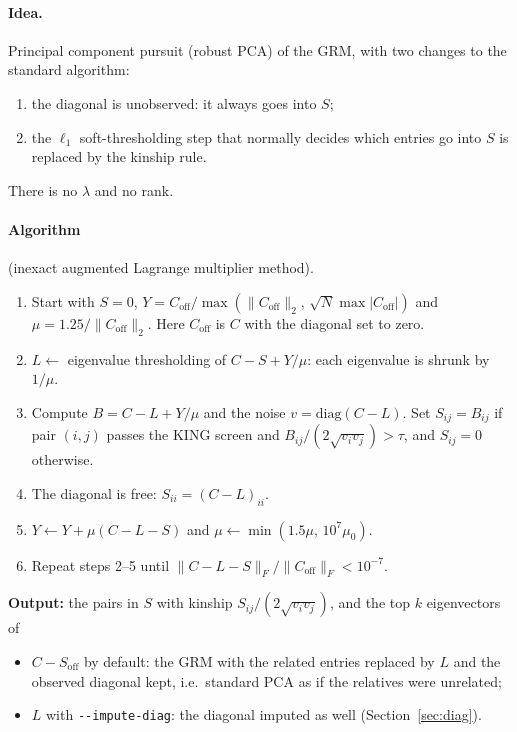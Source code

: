 \documentclass[11pt,a4paper]{article}
\newcommand{\opt}[1]{\texttt{-{}-#1}}
\begin{document}
\paragraph{Idea.}
Principal component pursuit (robust PCA) of the GRM, with two changes to the
standard algorithm:
\begin{enumerate}
  \item the diagonal is unobserved: it always goes into $S$;
  \item the $\ell_1$ soft-thresholding step that normally decides which
    entries go into $S$ is replaced by the kinship rule.
\end{enumerate}
There is no $\lambda$ and no rank.

\paragraph{Algorithm} (inexact augmented Lagrange multiplier method).
\begin{enumerate}
  \item Start with $S=0$, $Y=C_{\mathrm{off}}/\max(\|C_{\mathrm{off}}\|_2,\,
    \sqrt N\max|C_{\mathrm{off}}|)$ and $\mu=1.25/\|C_{\mathrm{off}}\|_2$.
    Here $C_{\mathrm{off}}$ is $C$ with the diagonal set to zero.
  \item $L \leftarrow$ eigenvalue thresholding of $C-S+Y/\mu$: each eigenvalue
    is shrunk by $1/\mu$.
  \item Compute $B=C-L+Y/\mu$ and the noise $v=\mathrm{diag}(C-L)$. Set
    $S_{ij}=B_{ij}$ if pair $(i,j)$ passes the KING screen and
    $B_{ij}/(2\sqrt{v_iv_j})>\tau$, and $S_{ij}=0$ otherwise.
  \item The diagonal is free: $S_{ii}=(C-L)_{ii}$.
  \item $Y\leftarrow Y+\mu(C-L-S)$ and $\mu\leftarrow\min(1.5\mu,\,10^7\mu_0)$.
  \item Repeat steps 2--5 until $\|C-L-S\|_F/\|C_{\mathrm{off}}\|_F<10^{-7}$.
\end{enumerate}
\textbf{Output:} the pairs in $S$ with kinship $S_{ij}/(2\sqrt{v_iv_j})$,
and the top $k$ eigenvectors of
\begin{itemize}
  \item $C-S_{\mathrm{off}}$ by default: the GRM with the related entries
    replaced by $L$ and the observed diagonal kept, i.e.\ standard PCA as if
    the relatives were unrelated;
  \item $L$ with \opt{impute-diag}: the diagonal imputed as well
    (Section~\ref{sec:diag}).
\end{itemize}
\end{document}
